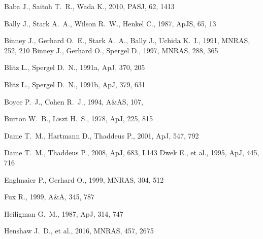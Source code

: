 \documentclass[useAMS,usenatbib]{mn2e}
\begin{document}
\begin{thebibliography}{}  

 Baba J., Saitoh T.~R., Wada K., 2010, PASJ, 62, 1413 

 Bally J., Stark A.~A., Wilson R.~W., Henkel C., 1987, ApJS, 65, 13 

 Binney J., Gerhard O.~E., Stark A.~A., Bally J., Uchida K.~I., 1991, MNRAS, 252, 210  
 Binney J., Gerhard O., Spergel D., 1997, MNRAS, 288, 365   

 Blitz L., Spergel D.~N., 1991a, ApJ, 370, 205 %

 Blitz L., Spergel D.~N., 1991b, ApJ, 379, 631 %

 Boyce P.~J., Cohen R.~J., 1994, A\&AS, 107,   

 Burton W.~B., Liszt H.~S., 1978, ApJ, 225, 815   


 Dame T.~M., Hartmann D., Thaddeus P., 2001, ApJ, 547, 792 




 Dame T.~M., Thaddeus P., 2008, ApJ, 683, L143  
 Dwek E., et al., 1995, ApJ, 445, 716 

 Englmaier P., Gerhard O., 1999, MNRAS, 304, 512 

 Fux R., 1999, A\&A, 345, 787  

 Heiligman G.~M., 1987, ApJ, 314, 747 

 Henshaw J.~D., et al., 2016, MNRAS, 457, 2675  


\end{thebibliography}
\end{document}

